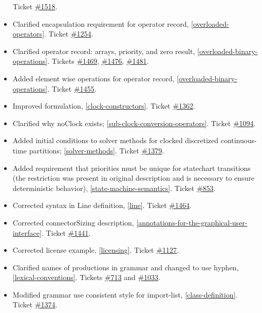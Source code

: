 \begin{itemize}
  Ticket \href{https://github.com/modelica/ModelicaSpecification/issues/1518}{\#1518}.
\item
  Clarified encapsulation requirement for operator record, \autoref{overloaded-operators}.
  Ticket \href{https://github.com/modelica/ModelicaSpecification/issues/1254}{\#1254}.
\item
  Clarified operator record: arrays, priority, and zero result,
  \autoref{overloaded-binary-operations}. Tickets
  \href{https://github.com/modelica/ModelicaSpecification/issues/1469}{\#1469},
  \href{https://github.com/modelica/ModelicaSpecification/issues/1476}{\#1476},
  \href{https://github.com/modelica/ModelicaSpecification/issues/1481}{\#1481}.
\item
  Added element wise operations for operator record, \autoref{overloaded-binary-operations}.
  Ticket \href{https://github.com/modelica/ModelicaSpecification/issues/1455}{\#1455}.
\item
  Improved formulation, \autoref{clock-constructors}. Ticket
  \href{https://github.com/modelica/ModelicaSpecification/issues/1362}{\#1362}.
\item
  Clarified why noClock exists; \autoref{sub-clock-conversion-operators}. Ticket
  \href{https://github.com/modelica/ModelicaSpecification/issues/1094}{\#1094}.
\item
  Added initial conditions to solver methods for clocked discretized
  continuous-time partitions; \autoref{solver-methods}. Ticket
  \href{https://github.com/modelica/ModelicaSpecification/issues/1379}{\#1379}.
\item
  Added requirement that priorities must be unique for statechart
  transitions (the restriction was present in original description and
  is necessary to ensure deterministic behavior), \autoref{state-machine-semantics}. Ticket
  \href{https://github.com/modelica/ModelicaSpecification/issues/853}{\#853}.
\item
  Corrected syntax in Line definition, \autoref{line}. Ticket
  \href{https://github.com/modelica/ModelicaSpecification/issues/1464}{\#1464}.
\item
  Corrected connectorSizing description, \autoref{annotations-for-the-graphical-user-interface}. Ticket
  \href{https://github.com/modelica/ModelicaSpecification/issues/1441}{\#1441}.
\item
  Corrected license example, \autoref{licensing}. Ticket
  \href{https://github.com/modelica/ModelicaSpecification/issues/1127}{\#1127}.
\item
  Clarified names of productions in grammar and changed to use hyphen,
  \autoref{lexical-conventions}. Tickets
  \href{https://github.com/modelica/ModelicaSpecification/issues/713}{\#713} and
  \href{https://github.com/modelica/ModelicaSpecification/issues/1033}{\#1033}.
\item
  Modified grammar use consistent style for import-list, \autoref{class-definition}.
  Ticket \href{https://github.com/modelica/ModelicaSpecification/issues/1374}{\#1374}.
\end{itemize}

